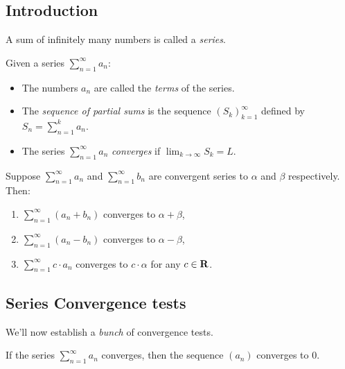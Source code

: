 \documentclass{article}
\begin{document}
    \subsection{Introduction}

    A sum of infinitely many numbers is called a \emph{series}. 

    \begin{defi}[Series]
      Given a series \(\displaystyle\sum_{n=1}^{\infty}a_n\): 
      \begin{itemize}
        \item The numbers \(a_n\) are called the \emph{terms} of the series.
        \item The \emph{sequence of partial sums} is the sequence \((S_k)_{k=1}^{\infty}\) defined by \(S_n = \displaystyle\sum_{n=1}^{k}a_n\).
        \item The series  \(\displaystyle\sum_{n=1}^{\infty}a_n\) \emph{converges} if \(\displaystyle\lim_{k \to \infty}S_k = L\). 
      \end{itemize}
      
    \end{defi}

    \begin{thm}
      Suppose \(\displaystyle\sum_{n=1}^{\infty}a_n\) and \(\displaystyle\sum_{n=1}^{\infty}b_n\) are convergent series to \(\alpha\) and \(\beta\) respectively. Then:
      \begin{enumerate}
        \item \(\displaystyle\sum_{n=1}^{\infty}(a_n + b_n)\) converges to \(\alpha + \beta\),
        \item \(\displaystyle\sum_{n=1}^{\infty}(a_n - b_n)\) converges to \(\alpha - \beta\),
        \item \(\displaystyle\sum_{n=1}^{\infty}c \cdot a_n\) converges to \(c \cdot \alpha\) for any \(c \in \mathbf{R}\).
      \end{enumerate}
    \end{thm}

    \subsection{Series Convergence tests}
    We'll now establish a \emph{bunch} of convergence tests.

    \begin{thm}
      If the series \(\displaystyle\sum_{n=1}^{\infty}a_n\) converges, then the sequence \((a_n)\) converges to 0.
    \end{thm}
\end{document}
